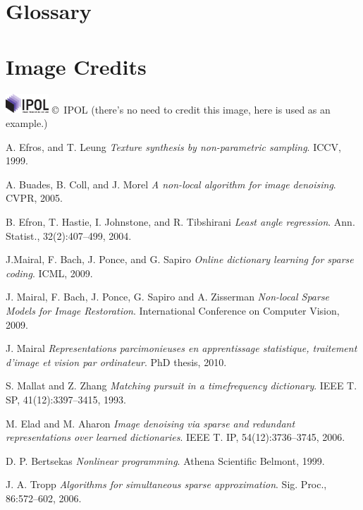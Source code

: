 \documentclass{ipol}
\begin{document}
\section*{Glossary}



\section*{Image Credits}

\includegraphics[height=2em]{ipol_logo} \copyright\ IPOL (there's no
need to credit this image, here is used as an example.)

\begin{thebibliography}{9}

	A. Efros, and T. Leung
	\emph{Texture synthesis by non-parametric sampling}.
	ICCV,
	1999.

	A. Buades, B. Coll, and J. Morel
	\emph{A non-local algorithm for image denoising}.
	CVPR,
	2005.

	B. Efron, T. Hastie, I. Johnstone, and R. Tibshirani
	\emph{Least angle regression}. 
	Ann. Statist.,
	32(2):407–499,
	2004.

	J.Mairal, F. Bach, J. Ponce, and G. Sapiro
	\emph{Online dictionary learning for sparse coding}.
	ICML,
	2009.

	J. Mairal, F. Bach, J. Ponce, G. Sapiro and A. Zisserman
	\emph{ Non-local Sparse Models for Image Restoration}.
	International Conference on Computer Vision,
	2009.

	J. Mairal
	\emph{ Representations parcimonieuses en apprentissage statistique, traitement d’image et
vision par ordinateur}.
	PhD thesis,
	2010.

	S. Mallat and Z. Zhang
 	\emph{Matching pursuit in a timefrequency dictionary}.
	IEEE T. SP,
	41(12):3397–3415,
	1993.

	M. Elad and M. Aharon
	\emph{Image denoising via sparse and redundant representations over learned dictionaries}.
	IEEE T.
	IP, 54(12):3736–3745,
	2006.
	
	D. P. Bertsekas
	\emph{Nonlinear programming}.
	Athena Scientific Belmont,
	1999.
	
	J. A. Tropp
	\emph{Algorithms for simultaneous sparse approximation}.
	Sig. Proc.,
	86:572–602,
	2006.	

\end{thebibliography}
\end{document}

